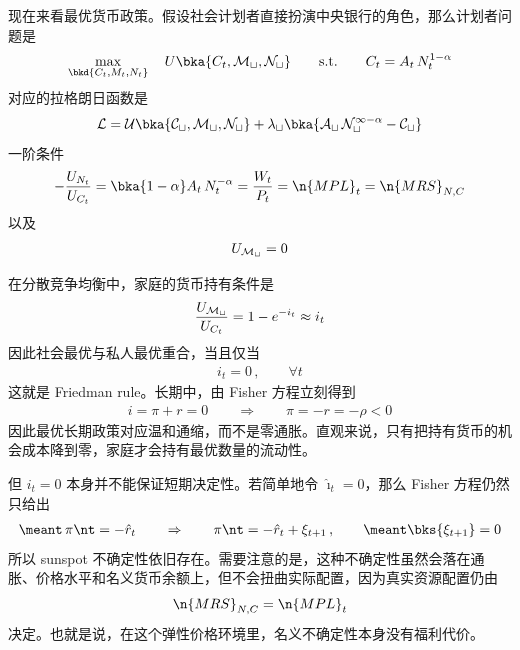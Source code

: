 
现在来看最优货币政策。假设社会计划者直接扮演中央银行的角色，那么计划者问题是
\begin{align*}
    \max_{\bkd{C_t,M_t,N_t}}\quad U\bka{C_t,\cal M_t,N_t}
    \qquad\text{s.t.}\qquad
    C_t=A_t\,N_t^{1-\alpha}
\end{align*}
对应的拉格朗日函数是
\begin{align*}
    \cal L=U\bka{C_t,\cal M_t,N_t}+\lambda_t\bka{A_t\,N_t^{1-\alpha}-C_t}
\end{align*}
一阶条件
\begin{align*}
    -\dfrac{U_{N_t}}{U_{C_t}}
    =\bka{1-\alpha}A_t\,N_t^{-\alpha}
    =\dfrac{W_t}{P_t}
    =\n{MPL}_t
    =\n{MRS}_{N,C}
\end{align*}
以及
\begin{align*}
    U_{\cal M_t}=0
\end{align*}

\myskip
{}

在分散竞争均衡中，家庭的货币持有条件是
\begin{align*}
    \dfrac{U_{\cal M_t}}{U_{C_t}}=1-e^{-i_t}\approx i_t
\end{align*}
因此社会最优与私人最优重合，当且仅当
\begin{align*}
    i_t=0\,,\qquad \forall t
\end{align*}
这就是 Friedman rule。长期中，由 Fisher 方程立刻得到
\begin{align*}
    i=\pi+r=0
    \qquad\Rightarrow\qquad
    \pi=-r=-\rho<0
\end{align*}
因此最优长期政策对应温和通缩，而不是零通胀。直观来说，只有把持有货币的机会成本降到零，家庭才会持有最优数量的流动性。

\myskip
{}

但 \(i_t=0\) 本身并不能保证短期决定性。若简单地令 \(\hat\imath_t=0\)，那么 Fisher 方程仍然只给出
\begin{align*}
    \meant\,\pi\nt=-\hat r_t
    \qquad\Rightarrow\qquad
    \pi\nt=-\hat r_t+\xi_{t+1}\,,\qquad \meant\bks{\xi_{t+1}}=0
\end{align*}
所以 sunspot 不确定性依旧存在。需要注意的是，这种不确定性虽然会落在通胀、价格水平和名义货币余额上，但不会扭曲实际配置，因为真实资源配置仍由
\begin{align*}
    \n{MRS}_{N,C}=\n{MPL}_t
\end{align*}
决定。也就是说，在这个弹性价格环境里，名义不确定性本身没有福利代价。

